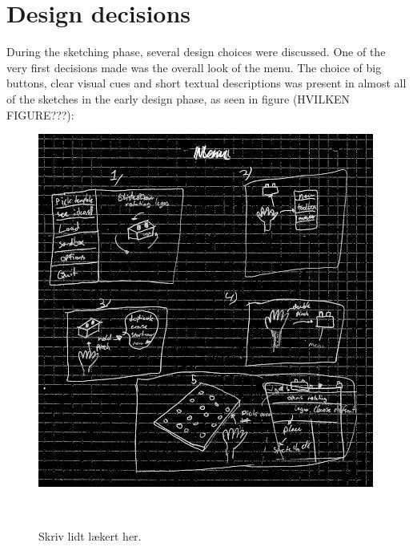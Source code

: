 
\section{Design decisions}
During the sketching phase, several design choices were discussed. One of the very first decisions made was the overall look of the menu. The choice of big buttons, clear visual cues and short textual descriptions was present in almost all of the sketches in the early design phase, as seen in figure (HVILKEN FIGURE???):\\
\begin{figure}
\centering
  \includegraphics[width=0.9\columnwidth]{figures/Menu/menu2.png}
  \caption{Skriv lidt lækert her. }~\label{fig:genboard}
\end{figure}
